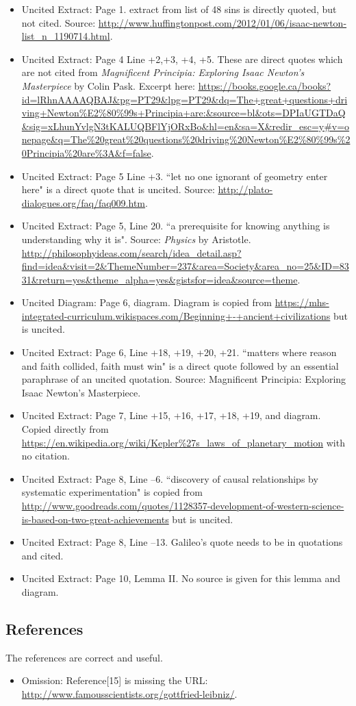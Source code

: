 \documentclass[11pt]{article}
\begin{document}
\begin{itemize}
\item Uncited Extract: Page 1. extract from list of 48 sins is directly quoted, but not cited. Source: \url{http://www.huffingtonpost.com/2012/01/06/isaac-newton-list_n_1190714.html}.
\item Uncited Extract: Page 4 Line +2,+3, +4, +5. These are direct quotes which are not cited from \textit{Magnificent Principia: Exploring Isaac Newton's Masterpiece} by Colin Pask. Excerpt here: \url{https://books.google.ca/books?id=lRhnAAAAQBAJ&pg=PT29&lpg=PT29&dq=The+great+questions+driving+Newton\%E2\%80\%99s+Principia+are:\&source=bl&ots=DPIaUGTDaQ&sig=xLhunYvlgN3tKALUQBFlYjORxBo&hl=en&sa=X&redir_esc=y#v=onepage&q=The\%20great\%20questions\%20driving\%20Newton\%E2\%80\%99s\%20Principia\%20are\%3A&f=false}.
\item Uncited Extract: Page 5 Line +3. ``let no one ignorant of geometry enter here" is a direct quote that is uncited. Source: \url{http://plato-dialogues.org/faq/faq009.htm}.
\item Uncited Extract: Page 5, Line 20. ``a prerequisite for knowing anything is understanding why it is". Source: \textit{Physics} by Aristotle. \url{http://philosophyideas.com/search/idea_detail.asp?find=idea&visit=2&ThemeNumber=237&area=Society&area_no=25&ID=8331&return=yes&theme_alpha=yes&gistsfor=idea&source=theme}.
\item Uncited Diagram: Page 6, diagram. Diagram is copied from \url{https://mhs-integrated-curriculum.wikispaces.com/Beginning+-+ancient+civilizations} but is uncited.
\item Uncited Extract: Page 6, Line +18, +19, +20, +21. ``matters where reason and faith collided, faith must win" is a direct quote followed by an essential paraphrase of an uncited quotation. Source: Magnificent Principia: Exploring Isaac Newton's Masterpiece.
\item Uncited Extract: Page 7, Line +15, +16, +17, +18, +19, and diagram. Copied directly from \url{https://en.wikipedia.org/wiki/Kepler\%27s_laws_of_planetary_motion} with no citation.
\item Uncited Extract: Page 8, Line --6. ``discovery of causal relationships by systematic experimentation" is copied from \url{http://www.goodreads.com/quotes/1128357-development-of-western-science-is-based-on-two-great-achievements} but is uncited.
\item Uncited Extract: Page 8, Line --13. Galileo's quote needs to be in quotations and cited. 
\item Uncited Extract: Page 10, Lemma II. No source is given for this lemma and diagram.
\end{itemize}

\subsection*{References}

The references are correct and useful.

\begin{itemize}
\item Omission: Reference[15] is missing the URL: \url{http://www.famousscientists.org/gottfried-leibniz/}.
\end{itemize}
\end{document}
